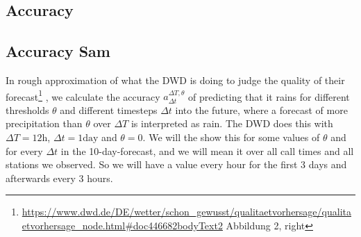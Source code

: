 \documentclass{article}
\theoremstyle{plain}
\theoremstyle{definition}
\theoremstyle{remark}
\begin{document}



\subsection{Accuracy}\label{sec:accuracy}



\subsection{Accuracy Sam}

In rough approximation of what the DWD is doing to judge the quality of their
forecast\footnote{\url{https://www.dwd.de/DE/wetter/schon_gewusst/qualitaetvorhersage/qualitaetvorhersage_node.html\#doc446682bodyText2}
    Abbildung 2, right}
, we calculate the accuracy $a^{\Delta T, \theta}_{\Delta t}$ of predicting
that it rains for different thresholds $\theta$ and different timesteps $\Delta
    t$ into the future, where a forecast of more precipitation than $\theta$ over
$\Delta T$ is interpreted as rain.
The DWD does this with $\Delta T = 12\text{h}$, $\Delta t = 1 \text{day}$ and
$\theta = 0$.
We will the show this for some values of $\theta$ and for every $\Delta t$ in
the 10-day-forecast, and we will mean it over all call times and all stations
we observed.
So we will have a value every hour for the first 3 days and afterwards every 3
hours.
\end{document}

